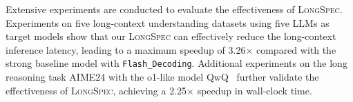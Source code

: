 Extensive experiments are conducted to evaluate the effectiveness of \textsc{LongSpec}.
Experiments on five long-context understanding datasets using five LLMs as target models show that our \textsc{LongSpec} can effectively reduce the long-context inference latency, leading to a maximum speedup of 3.26$\times$ compared with the strong baseline model with \texttt{Flash\_Decoding}.
Additional experiments on the long reasoning task AIME24 with the o1-like model QwQ~\cite{qwen2024qwq} further validate the effectiveness of \textsc{LongSpec}, achieving a 2.25$\times$ speedup in wall-clock time.